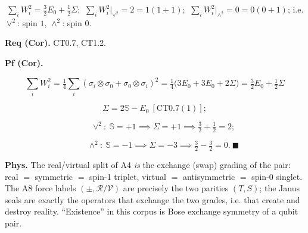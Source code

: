 \begin{corollary}\label{tag:CT0-7a}
$\ \sum_iW_i^2=\tfrac32E_0+\tfrac12\Sigma$; $\ \sum_iW_i^2\big|_{\vee^2}=2=1(1{+}1)$; $\ \sum_iW_i^2\big|_{\wedge^2}=0=0(0{+}1)$; i.e. $\vee^2$: spin $1$, $\wedge^2$: spin $0$.

\textbf{Req (Cor).} CT0.7, CT1.2.

\textbf{Pf (Cor).}

\[
\textstyle\sum_iW_i^2=\tfrac14\sum_i(\sigma_i\otimes\sigma_0+\sigma_0\otimes\sigma_i)^2=\tfrac14\bigl(3E_0+3E_0+2\Sigma\bigr)=\tfrac32E_0+\tfrac12\Sigma
\]

\[
\Sigma=2\mathbb S-E_0\ [\mathrm{CT0.7}(1)];
\]

\[
\qquad \vee^2:\ \mathbb S=+1\implies\Sigma=+1\implies\tfrac32+\tfrac12=2;
\]

\[
\qquad \wedge^2:\ \mathbb S=-1\implies\Sigma=-3\implies\tfrac32-\tfrac32=0.\ \blacksquare
\]

\textbf{Phys.} The real/virtual split of A4 \textit{is} the exchange (swap) grading of the pair: real $=$ symmetric $=$ spin-1 triplet, virtual $=$ antisymmetric $=$ spin-0 singlet. The A8 force labels $(\pm,\mathcal R/\mathcal V)$ are precisely the two parities $(T,S)$; the Janus seals are exactly the operators that exchange the two grades, i.e. that create and destroy reality. “Existence” in this corpus is Bose exchange symmetry of a qubit pair.

\end{corollary}

